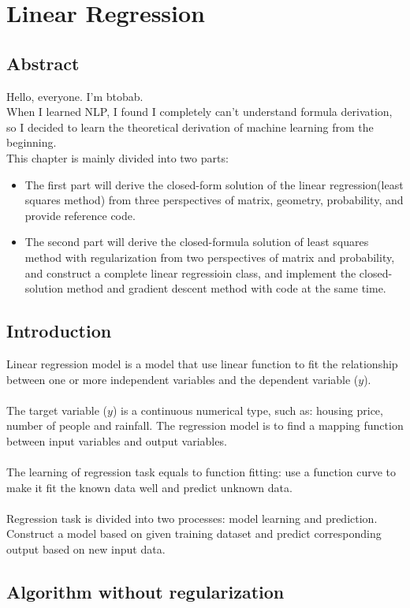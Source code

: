 \documentclass{report}
\begin{document}
\chapter{Linear Regression}
\section{Abstract}
Hello, everyone. I'm btobab.\\
When I learned NLP, I found I completely can't understand formula derivation, so I decided to learn the theoretical derivation of machine learning from the beginning.\\
This chapter is mainly divided into two parts:
\begin{itemize}
	\item[] The first part will derive the closed-form solution of the linear regression(least squares method) from three perspectives of matrix, geometry, probability, and provide reference code.
	\item[] The second part will derive the closed-formula solution of least squares method with regularization from two perspectives of matrix and probability, and construct a complete linear regressioin class, and implement the closed-solution method and gradient descent method with code at the same time.
\end{itemize}
\section{Introduction}
Linear regression model is a model that use linear function to fit the relationship between one or more independent variables and the dependent variable ($y$).\\\\
The target variable ($y$) is a continuous numerical type, such as: housing price, number of people and rainfall. The regression model is to find a mapping function between input variables and output variables.\\\\
The learning of regression task equals to function fitting: use a function curve to make it fit the known data well and predict unknown data.\\\\
Regression task is divided into two processes: model learning and prediction. Construct a model based on given training dataset and predict corresponding output based on new input data.
\section{Algorithm without regularization}
\end{document}
